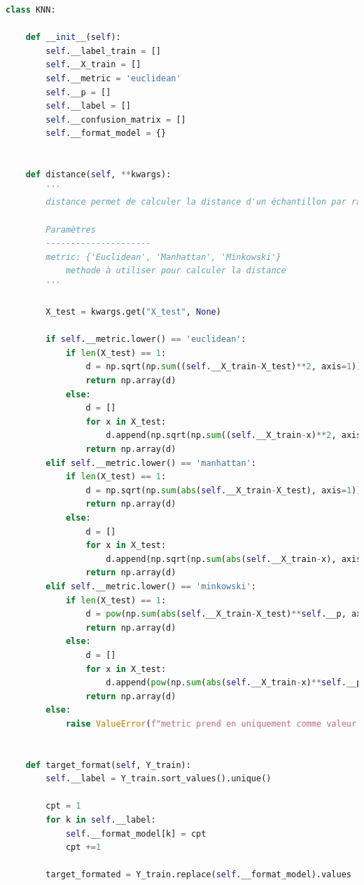 \documentclass[french]{article}
\begin{document}
\begin{lstlisting}[language=Python]
class KNN:

    def __init__(self):
        self.__label_train = []
        self.__X_train = []
        self.__metric = 'euclidean'
        self.__p = []
        self.__label = []
        self.__confusion_matrix = []
        self.__format_model = {}

    
    def distance(self, **kwargs):
        '''
        distance permet de calculer la distance d'un échantillon par rapport aux autres.

        Paramètres
        ---------------------
        metric: {'Euclidean', 'Manhattan', 'Minkowski'}
            methode à utiliser pour calculer la distance 
        '''

        X_test = kwargs.get("X_test", None)

        if self.__metric.lower() == 'euclidean':
            if len(X_test) == 1:
                d = np.sqrt(np.sum((self.__X_train-X_test)**2, axis=1))
                return np.array(d)
            else:
                d = []
                for x in X_test:
                    d.append(np.sqrt(np.sum((self.__X_train-x)**2, axis=1)))
                return np.array(d)
        elif self.__metric.lower() == 'manhattan':
            if len(X_test) == 1:
                d = np.sqrt(np.sum(abs(self.__X_train-X_test), axis=1))
                return np.array(d)
            else:
                d = []
                for x in X_test:
                    d.append(np.sqrt(np.sum(abs(self.__X_train-x), axis=1)))
                return np.array(d)
        elif self.__metric.lower() == 'minkowski':
            if len(X_test) == 1:
                d = pow(np.sum(abs(self.__X_train-X_test)**self.__p, axis=1), 1/self.__p)
                return np.array(d)
            else:
                d = []
                for x in X_test:
                    d.append(pow(np.sum(abs(self.__X_train-x)**self.__p, axis=1), 1/self.__p))
                return np.array(d)
        else:
            raise ValueError(f"metric prend en uniquement comme valeur 'euclidean', 'manhattan', ou 'minkowski' (saisie {self.__metric})")


    def target_format(self, Y_train):
        self.__label = Y_train.sort_values().unique()

        cpt = 1
        for k in self.__label:
            self.__format_model[k] = cpt
            cpt +=1
        
        target_formated = Y_train.replace(self.__format_model).values


\end{lstlisting}
\end{document}
